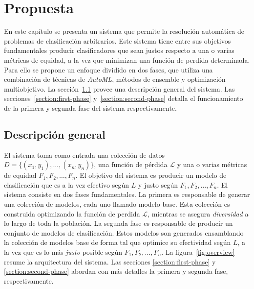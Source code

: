 \chapter{Propuesta}\label{chapter:proposal}

En este capítulo se presenta un sistema que permite la resolución automática de problemas de clasificación arbitrarios.
Este sistema tiene entre sus objetivos fundamentales producir clasificadores que sean justos respecto a una o varias métricas de equidad, a la vez que minimizan una función de perdida determinada.
Para ello se propone un enfoque dividido en dos fases, que utiliza una combinación de técnicas de \emph{AutoML}, métodos de ensemble y optimización multiobjetivo.
La sección~\ref{section:overview} provee una descripción general del sistema.
Las secciones~\ref{section:first-phase} y~\ref{section:second-phase} detalla el funcionamiento de la primera y segunda fase del sistema respectivamente.

\section{Descripción general}\label{section:overview}

El sistema toma como entrada una colección de datos $D = \{(x_1, y_1), \dots , (x_n, y_n)\}$, una función de pérdida $\mathcal{L}$ y una o varias métricas de equidad $F_1, F_2, \dots, F_n$.
El objetivo del sistema es producir un modelo de clasificación que es a la vez efectivo según $L$ y justo según $F_1, F_2, \dots, F_n$.
El sistema consiste en dos fases fundamentales.
La primera es responsable de generar una colección de modelos, cada uno llamado modelo base.
Esta colección es construida optimizando la función de perdida $\mathcal{L}$, mientras se asegura \emph{diversidad} a lo largo de toda la población.
La segunda fase es responsable de producir un conjunto de modelos de clasificación.
Estos modelos son generados ensamblando la colección de modelos base de forma tal que optimice su efectividad según $L$, a la vez que es lo más \emph{justo} posible según $F_1, F_2, \dots, F_n$.
La figura~\ref{fig:overview} resume la arquitectura del sistema.
Las secciones \ref{section:first-phase} y \ref{section:second-phase} abordan con más detalles la primera y segunda fase, respectivamente.

